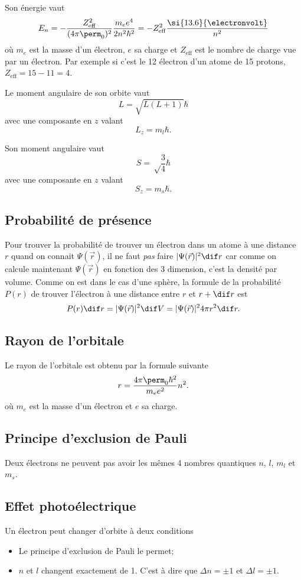 Son énergie vaut
\[ E_n = -\frac{Z_\mathrm{eff}^2}{(4\pi\perm_0)^2}\frac{m_ee^4}{2n^2\hbar^2}
= -Z_\mathrm{eff}^2\frac{\si{13.6}{\electronvolt}}{n^2} \]
où $m_e$ est la masse d'un électron, $e$ sa charge et
$Z_\mathrm{eff}$ est le nombre de charge vue par un électron.
Par exemple si c'est le 12\ieme{} électron d'un atome de 15 protons,
$Z_\mathrm{eff} = 15 - 11 = 4$.

Le moment angulaire de son orbite vaut
\[ L = \sqrt{L(L+1)} \hbar \]
avec une composante en $z$ valant
\[ L_z = m_l \hbar. \]

Son moment angulaire vaut
\[ S = \sqrt\frac34 \hbar \]
avec une composante en $z$ valant
\[ S_z = m_s \hbar. \]

\subsection{Probabilité de présence}
Pour trouver la probabilité de trouver un électron dans un atome
à une distance $r$ quand on connait $\Psi(\vec{r})$,
il ne faut \emph{pas} faire $|\Psi(\vec{r})|^2 \dif r$
car comme on calcule maintenant $\Psi(\vec{r})$ en fonction des 3 dimension,
c'est la densité par volume.
Comme on est dans le cas d'une sphère, la formule de la probabilité
$P(r)$ de trouver l'électron à une distance entre $r$ et $r+\dif r$ est
\[ P(r) \dif r = |\Psi(\vec{r})|^2 \dif V
= |\Psi(\vec{r})|^2 4\pi r^2 \dif r. \]

\subsection{Rayon de l'orbitale}
Le rayon de l'orbitale est obtenu par la formule suivante
\[ r = \frac{4\pi\perm_0\hbar^2}{m_ee^2}n^2. \]
où $m_e$ est la masse d'un électron et $e$ sa charge.

\subsection{Principe d'exclusion de Pauli}
Deux électrons ne peuvent pas avoir les mêmes 4 nombres quantiques
$n$, $l$, $m_l$ et $m_s$.

\subsection{Effet photoélectrique}
Un électron peut changer d'orbite à deux conditions
\begin{itemize}
  \item Le principe d'exclusion de Pauli le permet;
  \item $n$ et $l$ changent exactement de 1.
    C'est à dire que $\Delta n = \pm 1$ et $\Delta l = \pm 1$.
\end{itemize}

